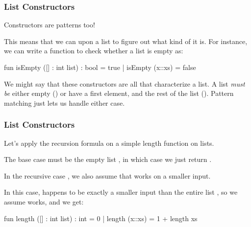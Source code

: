 \documentclass[aspectratio=169]{beamer}
\begin{document}
\begin{frame}[fragile]
  \frametitle{List Constructors}

  Constructors are patterns too! 

  \vspace{\fill}

  This means that we can  upon a list to figure out what kind of 
   it is. For instance, we can write a function to check whether
  a list is empty as:
  
  \begin{codeblock}
    fun isEmpty ([] : int list) : bool = true
      | isEmpty (x::xs) = false
  \end{codeblock}

  \vspace{\fill}

  We might say that these constructors are all that characterize a list. A list 
  \textit{must be} either empty (\code{[]}) or have a first element, and the rest of 
  the list (). Pattern matching just lets us handle either case.
\end{frame}

\begin{frame}[fragile]
  \frametitle{List Constructors}

  Let's apply the recursion formula on a simple length function on lists.

  \vspace{\fill}

  The base case must be the empty list \code{[]}, in which case we just return . 

  \vspace{10pt}

  In the recursive case , we also assume that  works on a smaller
  input. 

  \vspace{5pt}
  
  In this case,  happens to be exactly a smaller input than the entire 
  list , so we assume  works, and we get: 

  \vspace{\fill}

  \begin{codeblock}
    fun length ([] : int list) : int = 0 
      | length (x::xs) = 1 + length xs
  \end{codeblock}

\end{frame}
\end{document}
